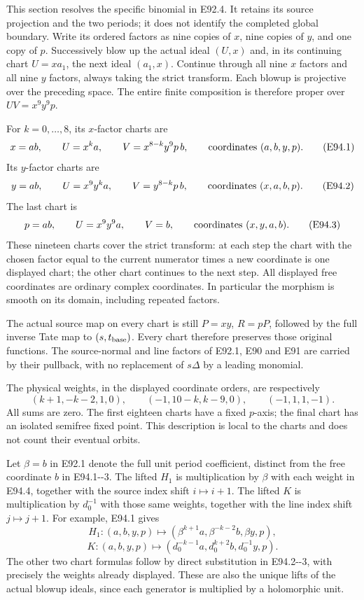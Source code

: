 \par\nobreak

This section resolves the specific binomial in E92.4.
It retains its source projection and the two periods;
it does not identify the completed global boundary.
Write its ordered factors as nine copies of \(x\),
nine copies of \(y\), and one copy of \(p\).
Successively blow up the actual ideal \((U,x)\) and,
in its continuing chart \(U=xa_1\), the next ideal
\((a_1,x)\). Continue through all nine \(x\) factors
and all nine \(y\) factors, always taking the strict
transform. Each blowup is projective over the preceding
space. The entire finite composition is therefore proper
over \(UV=x^9y^9p\).

For \(k=0,\ldots,8\), its \(x\)-factor charts are
\[
 x=ab,\qquad U=x^k a,\qquad
 V=x^{8-k}y^9p\,b,
 \qquad\hbox{coordinates }(a,b,y,p).             \tag{E94.1}
\]
Its \(y\)-factor charts are
\[
 y=ab,\qquad U=x^9y^k a,\qquad
 V=y^{8-k}p\,b,
 \qquad\hbox{coordinates }(x,a,b,p).             \tag{E94.2}
\]
The last chart is
\[
 p=ab,\qquad U=x^9y^9a,\qquad V=b,
 \qquad\hbox{coordinates }(x,y,a,b).             \tag{E94.3}
\]
These nineteen charts cover the strict transform:
at each step the chart with the chosen factor equal
to the current numerator times a new coordinate is
one displayed chart; the other chart continues to the
next step. All displayed free coordinates are ordinary
complex coordinates. In particular the morphism is
smooth on its domain, including repeated factors.

The actual source map on every chart is still
\(P=xy\), \(R=pP\), followed by the full inverse
Tate map to \((s,t_{\rm base})\). Every chart therefore
preserves those original functions. The source-normal
and line factors of E92.1, E90 and E91 are carried
by their pullback, with no replacement of \(s\Delta\)
by a leading monomial.

The physical weights, in the displayed coordinate
orders, are respectively
\[
 (k+1,-k-2,1,0),\qquad
 (-1,10-k,k-9,0),\qquad (-1,1,1,-1).             \tag{E94.4}
\]
All sums are zero. The first eighteen charts have a
fixed \(p\)-axis; the final chart has an isolated
semifree fixed point. This description is local to
the charts and does not count their eventual orbits.

Let \(\beta=b\) in E92.1 denote the full unit period
coefficient, distinct from the free coordinate \(b\)
in E94.1-\/-3. The lifted \(H_1\) is multiplication by
\(\beta\) with each weight in E94.4, together with
the source index shift \(i\mapsto i+1\).
The lifted \(K\) is multiplication by \(d_0^{-1}\)
with those same weights, together with the line index
shift \(j\mapsto j+1\). For example, E94.1 gives
\[
 H_1:(a,b,y,p)\longmapsto
 (\beta^{k+1}a,\beta^{-k-2}b,\beta y,p),
\]
\[
 K:(a,b,y,p)\longmapsto
 (d_0^{-k-1}a,d_0^{k+2}b,d_0^{-1}y,p).         \tag{E94.5}
\]
The other two chart formulas follow by direct
substitution in E94.2-\/-3, with precisely the weights
already displayed. These are also the unique lifts
of the actual blowup ideals, since each generator is
multiplied by a holomorphic unit.

